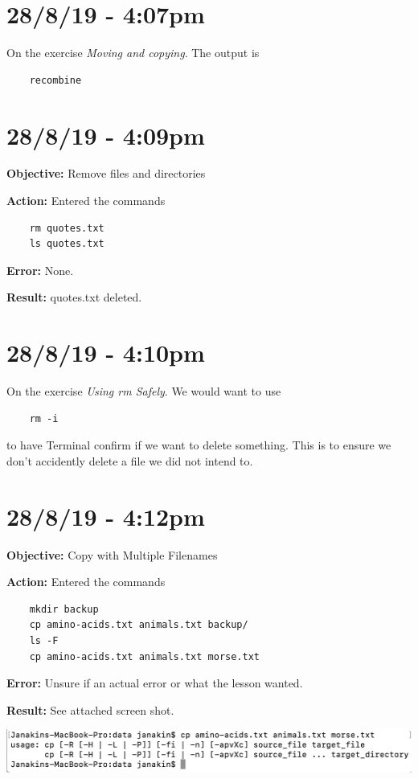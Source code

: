 \documentclass{article}
\begin{document}
\section*{28/8/19 - 4:07pm}

On the exercise \textit{Moving and copying}. The output is \begin{verbatim}
    recombine
\end{verbatim}

\section*{28/8/19 - 4:09pm}

\textbf{Objective:} Remove files and directories

\textbf{Action:} Entered the commands \begin{verbatim}
    rm quotes.txt
    ls quotes.txt
\end{verbatim}

\textbf{Error:} None.

\textbf{Result:} quotes.txt deleted.

\section*{28/8/19 - 4:10pm}

On the exercise \textit{Using rm Safely}. We would want to use \begin{verbatim}
    rm -i
\end{verbatim} to have Terminal confirm if we want to delete something. This is to ensure we don't accidently delete a file we did not intend to.

\section*{28/8/19 - 4:12pm}

\textbf{Objective:} Copy with Multiple Filenames

\textbf{Action:} Entered the commands \begin{verbatim}
    mkdir backup
    cp amino-acids.txt animals.txt backup/
    ls -F
    cp amino-acids.txt animals.txt morse.txt 
\end{verbatim}

\textbf{Error:} Unsure if an actual error or what the lesson wanted.

\textbf{Result:} See attached screen shot.

\includegraphics[width=\textwidth]{figj.png}
\end{document}
